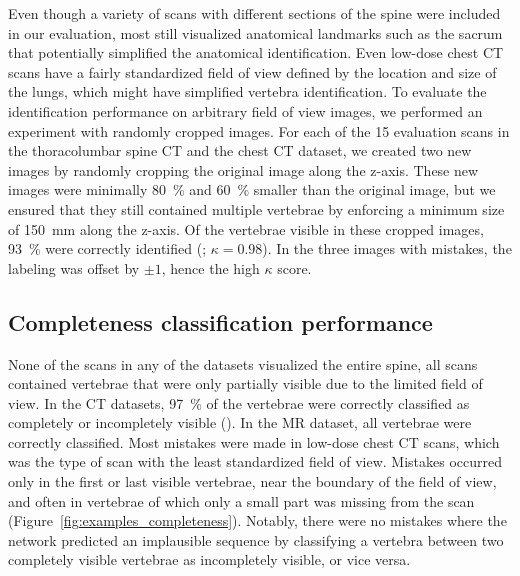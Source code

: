 \documentclass[authoryear,5p,final,times]{elsarticle}
\begin{document}
	Even though a variety of scans with different sections of the spine were included in our evaluation, most still visualized anatomical landmarks such as the sacrum that potentially simplified the anatomical identification. Even low-dose chest CT scans have a fairly standardized field of view defined by the location and size of the lungs, which might have simplified vertebra identification. To evaluate the identification performance on arbitrary field of view images, we performed an experiment with randomly cropped images. For each of the 15 evaluation scans in the thoracolumbar spine CT and the chest CT dataset, we created two new images by randomly cropping the original image along the z-axis. These new images were minimally \SI{80}{\percent} and \SI{60}{\percent} smaller than the original image, but we ensured that they still contained multiple vertebrae by enforcing a minimum size of \SI{150}{\milli\meter} along the z-axis. Of the vertebrae visible in these cropped images,  \SI{93}{\percent} were correctly identified (; $\kappa = 0.98$). In the three images with mistakes, the labeling was offset by $\pm 1$, hence the high $\kappa$ score.

	\subsection{Completeness classification performance}

	None of the scans in any of the datasets visualized the entire spine, all scans contained vertebrae that were only partially visible due to the limited field of view. In the CT datasets, \SI{97}{\percent} of the vertebrae were correctly classified as completely or incompletely visible ().  In the MR dataset, all vertebrae were correctly classified. Most mistakes were made in low-dose chest CT scans, which was the type of scan with the least standardized field of view. Mistakes occurred only in the first or last visible vertebrae, near the boundary of the field of view, and often in vertebrae of which only a small part was missing from the scan (Figure~\ref*{fig:examples_completeness}). Notably, there were no mistakes where the network predicted an implausible sequence by classifying a vertebra between two completely visible vertebrae as incompletely visible, or vice versa.

	\begin{figure*}[t]
		\caption{Examples of vertebra completeness classification results. Vertebrae classified as completely visible are marked in light green and vertebrae classified as incompletely visible are marked in red.  Arrows indicate misclassified vertebrae. Shown are low-dose chest CT scans (left and right) and a lumbar spine CT scan (center).}
		\label{fig:examples_completeness}
	\end{figure*}
\end{document}
